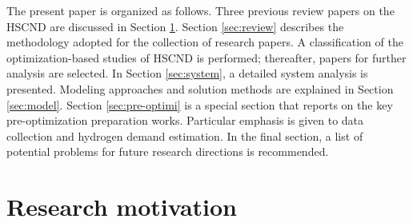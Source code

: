 \documentclass[11pt,3p]{elsarticle}
\begin{document}
The present paper is organized as follows. Three previous review papers on the HSCND are discussed in Section \ref{sec:motivation}. Section \ref{sec:review} describes the methodology adopted for the collection of research papers. A classification of the optimization-based studies of HSCND is performed; thereafter, papers for further analysis are selected. In Section \ref{sec:system}, a detailed system analysis is presented. Modeling approaches and solution methods are explained in Section \ref{sec:model}. Section \ref{sec:pre-optimi} is a special section that reports on the key pre-optimization preparation works. Particular emphasis is given to data collection and hydrogen demand estimation. In the final section, a list of potential problems for future research directions is recommended.

\section{Research motivation}
\label{sec:motivation}
\end{document}
